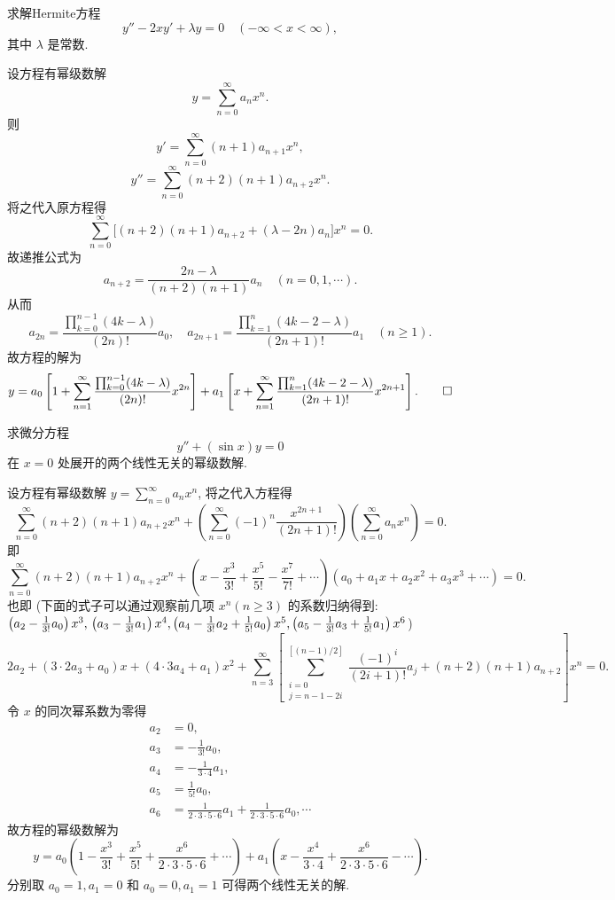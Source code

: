 \begin{exercise}
  求解Hermite方程
  \[y''-2xy'+\lambda y=0\quad (-\infty<x<\infty),\]
  其中 $\lambda$ 是常数.
\end{exercise}

\begin{solution} 
  设方程有幂级数解
  \[y=\sum_{n=0}^{\infty}a_nx^n.\]
  则
  \[y'=\sum_{n=0}^{\infty}(n+1)a_{n+1}x^n,\]
  \[y''=\sum_{n=0}^{\infty}(n+2)(n+1)a_{n+2}x^n.\]
  将之代入原方程得
  \[\sum_{n=0}^{\infty}\big[(n+2)(n+1)a_{n+2}+(\lambda-2n)a_n\big]x^n=0.\]
  故递推公式为
  \[a_{n+2}=\frac{2n-\lambda}{(n+2)(n+1)}a_n\quad (n=0,1,\cdots).\]
  从而
  \[a_{2n}=\frac{\prod_{k=0}^{n-1}(4k-\lambda)}{(2n)!}a_0,\quad
    a_{2n+1}=\frac{\prod_{k=1}^n(4k-2-\lambda)}{(2n+1)!}a_1\quad(n\geq1).\]
  故方程的解为
  \[y = a_0\left[1+\sum_{n=1}^{\infty}\frac{\prod_{k=0}^{n-1}(4k-\lambda)}{(2n)!}x^{2n}\right]
    + a_1\left[x+\sum_{n=1}^{\infty}\frac{\prod_{k=1}^n(4k-2-\lambda)}{(2n+1)!}x^{2n+1}\right].\qedhere\]
\end{solution}



\begin{exercise}
  求微分方程
  \[y''+(\sin x)y=0\]
  在 $x=0$ 处展开的两个线性无关的幂级数解.
\end{exercise}

\begin{solution}
  设方程有幂级数解 $y=\sum_{n=0}^{\infty}a_nx^n$, 将之代入方程得
  \[\sum_{n=0}^{\infty}(n+2)(n+1)a_{n+2}x^n
    + \left(\sum_{n=0}^{\infty}(-1)^n\frac{x^{2n+1}}{(2n+1)!}\right)
    \left(\sum_{n=0}^{\infty}a_nx^n\right)=0.\]
  即
  \[\sum_{n=0}^{\infty}(n+2)(n+1)a_{n+2}x^n
    + \left(x-\frac{x^3}{3!}+\frac{x^5}{5!}-\frac{x^7}{7!}
    + \cdots\right)\left(a_0+a_1x+a_2x^2+a_3x^3+\cdots\right)=0.\]
  也即 (下面的式子可以通过观察前几项 $x^n(n\geq3)$ 的系数归纳得到: 
  $\left(a_2-\frac{1}{3!}a_0\right)x^3,\\\left(a_3-\frac{1}{3!}a_1\right)x^4,\left(a_4-\frac{1}{3!}a_2+\frac{1}{5!}a_0\right)x^5,\left(a_5-\frac{1}{3!}a_3+\frac{1}{5!}a_1\right)x^6$)
  \[2a_2+(3\cdot2a_3+a_0)x+(4\cdot3a_4+a_1)x^2
    + \sum_{n=3}^{\infty}\left[\sum_{\substack{i=0\\j=n-1-2i}}^{[(n-1)/2]}\frac{(-1)^i}{(2i+1)!}a_j+(n+2)(n+1)a_{n+2}\right]x^n=0.\]
  令 $x$ 的同次幂系数为零得
  \begin{align*}
    a_2 & = 0, \\
    a_3 & = -\frac{1}{3!}a_0, \\
    a_4 & = -\frac{1}{3\cdot4}a_1, \\
    a_5 & = \frac{1}{5!}a_0, \\
    a_6 & = \frac{1}{2\cdot 3\cdot 5\cdot 6}a_1+\frac{1}{2\cdot 3\cdot 5\cdot 6}a_0,\cdots
  \end{align*}
  故方程的幂级数解为
  \[y=a_0\left(1-\frac{x^3}{3!}+\frac{x^5}{5!}+\frac{x^6}{2\cdot3\cdot5\cdot6}
    + \cdots\right)+a_1\left(x-\frac{x^4}{3\cdot4}+\frac{x^6}{2\cdot3\cdot5\cdot6}-\cdots\right).\]
  分别取 $a_0=1,a_1=0$ 和 $a_0=0,a_1=1$ 可得两个线性无关的解.
\end{solution}



